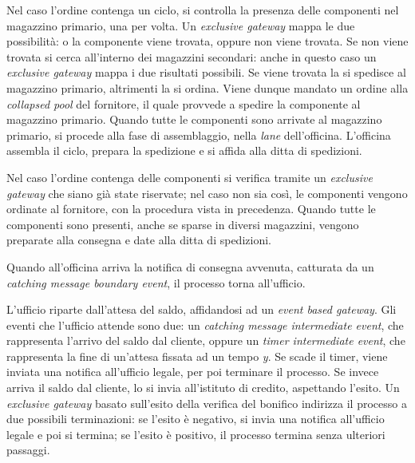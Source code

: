 Nel caso l'ordine contenga un ciclo, si controlla la presenza delle
componenti nel magazzino primario, una per volta. Un
\textit{exclusive gateway} mappa le due possibilit\`a: o la componente
viene trovata, oppure non viene trovata.
Se non viene trovata si cerca all'interno dei magazzini secondari:
anche in questo caso un \textit{exclusive gateway} mappa i due risultati
possibili. Se viene trovata la si spedisce al magazzino primario,
altrimenti la si ordina. Viene dunque mandato un ordine alla
\textit{collapsed pool} del fornitore, il quale provvede a spedire la
componente al magazzino primario. Quando tutte le componenti sono
arrivate al magazzino primario, si procede alla fase di assemblaggio,
nella \textit{lane} dell'officina. L'officina assembla il ciclo, prepara
la spedizione e si affida alla ditta di spedizioni.

Nel caso l'ordine contenga delle componenti si verifica tramite un
\textit{exclusive gateway} che siano gi\`a state riservate; nel caso non
sia cos\`i, le componenti vengono ordinate al fornitore, con la
procedura vista in precedenza. Quando tutte le componenti sono presenti,
anche se sparse in diversi magazzini, vengono preparate alla consegna e
date alla ditta di spedizioni.

Quando all'officina arriva la notifica di consegna avvenuta, catturata
da un \textit{catching message boundary event}, il processo torna
all'ufficio.

L'ufficio riparte dall'attesa del saldo, affidandosi ad un
\textit{event based gateway}. Gli eventi che l'ufficio attende sono due:
un \textit{catching message intermediate event}, che rappresenta
l'arrivo del saldo dal cliente, oppure un
\textit{timer intermediate event}, che rappresenta la fine di un'attesa
fissata ad un tempo \textit{y}. Se scade il timer, viene inviata una
notifica all'ufficio legale, per poi terminare il processo.
Se invece arriva il saldo dal cliente, lo si invia all'istituto di
credito, aspettando l'esito. Un \textit{exclusive gateway} basato
sull'esito della verifica del bonifico indirizza il processo a due
possibili terminazioni: se l'esito \`e negativo, si invia una notifica
all'ufficio legale e poi si termina; se l'esito \`e positivo, il
processo termina senza ulteriori passaggi.
